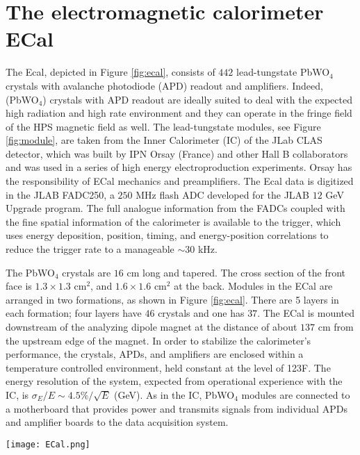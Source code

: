 \documentclass[11pt]{report}
\begin{document}
\section{The electromagnetic calorimeter ECal}
The Ecal, depicted in Figure \ref{fig:ecal}, consists of $442$ lead-tungstate PbWO$_4$ crystals with avalanche photodiode (APD) 
readout and amplifiers. Indeed,(PbWO$_4$) crystals with APD readout 
are ideally suited to deal with the expected high radiation and high rate environment and they can operate in the fringe field of the HPS
magnetic field as well.
The lead-tungstate modules, see Figure \ref{fig:module}, are taken from the Inner 
Calorimeter (IC) of the JLab CLAS detector, which was built by IPN Orsay (France) and other Hall B collaborators and was used
in a series of high energy electroproduction experiments. Orsay has the responsibility of ECal mechanics and preamplifiers. 
The Ecal data is digitized in the JLAB FADC250, a $250$ MHz flash ADC developed for the JLAB $12$ GeV Upgrade program.  
The full analogue information from the FADCs coupled with the fine spatial information of the calorimeter is available to the trigger, which uses energy deposition, position, timing, and energy-position correlations to reduce the trigger rate to a manageable $\sim 30$ kHz. 
 
The PbWO$_4$ crystals are $16$ cm long and tapered. The cross section of the front face is $1.3\times 1.3$ cm$^2$, 
and  $1.6\times 1.6$ cm$^2$ at the back. Modules in the ECal are arranged in two formations, as shown in Figure \ref{fig:ecal}. 
There are 5 layers in each formation; four layers have $46$ crystals and one has $37$. The ECal is mounted downstream of the 
analyzing dipole magnet at the distance of about $137$ cm from the upstream edge of the magnet.
 In order to stabilize the calorimeter's performance, 
the crystals, APDs, and amplifiers are enclosed within a temperature controlled environment, held constant at 
the level of 1\!\char23F. The energy resolution of the system, expected from operational experience with the IC, 
is $\sigma_E/E \sim 4.5\%/\sqrt{E}$ (GeV). As in the IC, PbWO$_4$ modules are connected to a motherboard that provides
power and transmits signals from individual APDs and amplifier boards to the data acquisition system. 
\begin{figure*}[t]
\texttt{[image: ECal.png]}
\caption{\small{Arrangement of Ecal crystals. The two modules are positioned above and below the beam plane. Each module has 5 layers. 
There are 46 crystals in each layer, with the exception of the layers closest to the beam plane in which 9 crystals are removed to allow 
a larger opening for the outgoing electron and photon beams.}}\label{fig:ecal}
\end{figure*}
\end{document}
